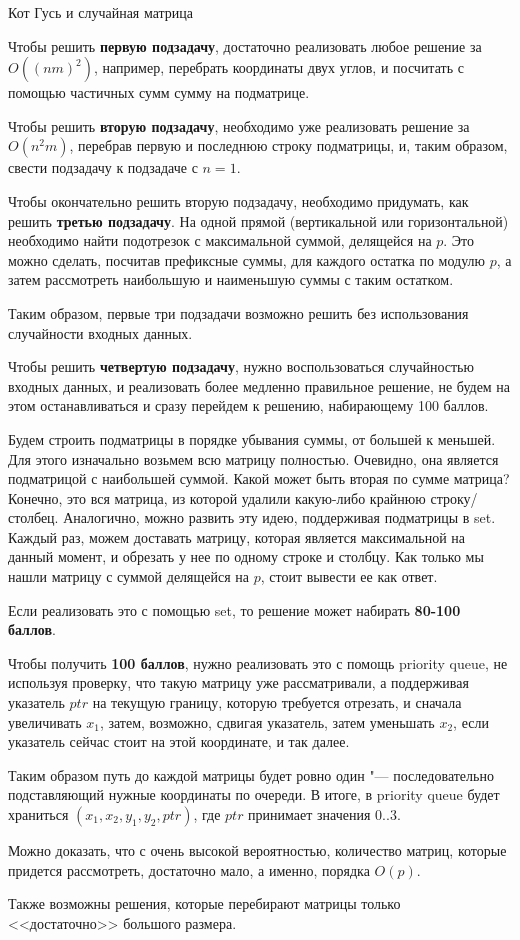 \begin{tutorial}{Кот Гусь и случайная матрица}

Чтобы решить \textbf{первую подзадачу}, достаточно реализовать любое решение за $O((nm)^2)$, например, перебрать координаты двух углов, и посчитать с помощью частичных сумм сумму на подматрице.

Чтобы решить \textbf{вторую подзадачу}, необходимо уже реализовать решение за $O(n^2m)$, перебрав первую и последнюю строку подматрицы, и, таким образом, свести подзадачу к подзадаче с $n=1$.

Чтобы окончательно решить вторую подзадачу, необходимо придумать, как решить \textbf{третью подзадачу}. На одной прямой (вертикальной или горизонтальной) необходимо найти подотрезок с максимальной суммой, делящейся на $p$. Это можно сделать, посчитав префиксные суммы, для каждого остатка по модулю $p$, а затем рассмотреть наибольшую и наименьшую суммы с таким остатком.

Таким образом, первые три подзадачи возможно решить без использования случайности входных данных.

Чтобы решить \textbf{четвертую подзадачу}, нужно воспользоваться случайностью входных данных, и реализовать более медленно правильное решение, не будем на этом останавливаться и сразу перейдем к решению, набирающему 100 баллов.

Будем строить подматрицы в порядке убывания суммы, от большей к меньшей. Для этого изначально возьмем всю матрицу полностью. Очевидно, она является подматрицой с наибольшей суммой. Какой может быть вторая по сумме матрица? Конечно, это вся матрица, из которой удалили какую-либо крайнюю строку/столбец. Аналогично, можно развить эту идею, поддерживая подматрицы в set. Каждый раз, можем доставать матрицу, которая является максимальной на данный момент, и обрезать у нее по одному строке и столбцу. Как только мы нашли матрицу с суммой делящейся на $p$, стоит вывести ее как ответ. 

Если реализовать это с помощью set, то решение может набирать \textbf{80-100 баллов}.

Чтобы получить \textbf{100 баллов}, нужно реализовать это с помощь priority queue, не используя проверку, что  такую матрицу уже рассматривали, а поддерживая указатель $ptr$ на текущую границу, которую требуется отрезать, и сначала увеличивать $x_1$, затем, возможно, сдвигая указатель, затем уменьшать $x_2$, если указатель сейчас стоит на этой координате, и так далее. 

Таким образом путь до каждой матрицы будет ровно один "--- последовательно подставляющий нужные координаты по очереди.
В итоге, в priority queue будет храниться $(x_1, x_2, y_1, y_2, ptr)$, где $ptr$ принимает значения $0..3$. 

Можно доказать, что с очень высокой вероятностью, количество матриц, которые придется рассмотреть, достаточно мало, а именно, порядка $O(p)$.

Также возможны решения, которые перебирают матрицы только <<достаточно>> большого размера.

\end{tutorial}
